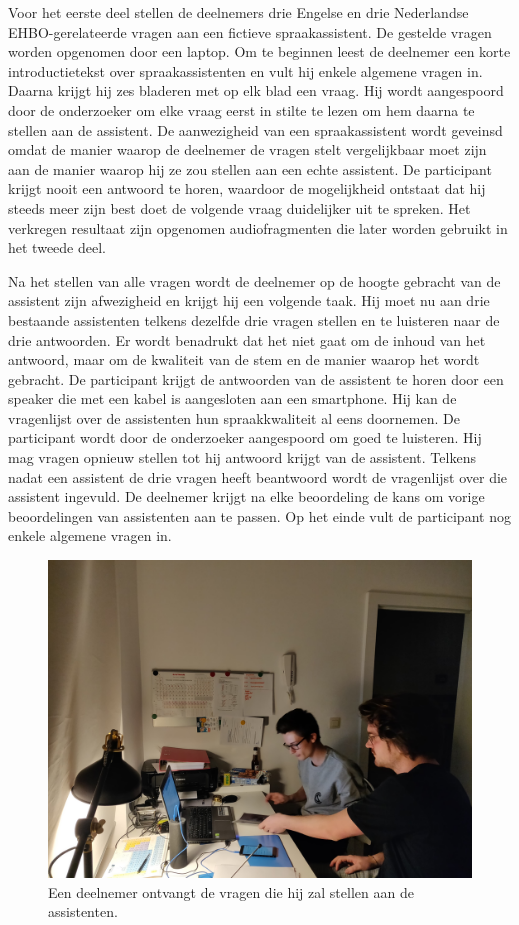 Voor het eerste deel stellen de deelnemers drie Engelse en drie Nederlandse EHBO-gerelateerde vragen aan een fictieve spraakassistent. De gestelde vragen worden opgenomen door een laptop.
Om te beginnen leest de deelnemer een korte introductietekst over spraakassistenten en vult hij enkele algemene vragen in. Daarna krijgt hij zes bladeren met op elk blad een vraag. Hij wordt aangespoord door de onderzoeker om elke vraag eerst in stilte te lezen om hem daarna te stellen aan de assistent. De aanwezigheid van een spraakassistent wordt geveinsd omdat de manier waarop de deelnemer de vragen stelt vergelijkbaar moet zijn aan de manier waarop hij ze zou stellen aan een echte assistent. De participant krijgt nooit een antwoord te horen, waardoor de mogelijkheid ontstaat dat hij steeds meer zijn best doet de volgende vraag duidelijker uit te spreken. Het verkregen resultaat zijn opgenomen audiofragmenten die later worden gebruikt in het tweede deel.

Na het stellen van alle vragen wordt de deelnemer op de hoogte gebracht van de assistent zijn afwezigheid en krijgt hij een volgende taak. Hij moet nu aan drie bestaande assistenten telkens dezelfde drie vragen stellen en te luisteren naar de drie antwoorden. Er wordt benadrukt dat het niet gaat om de inhoud van het antwoord, maar om de kwaliteit van de stem en de manier waarop het wordt gebracht. De participant krijgt de antwoorden van de assistent te horen door een speaker die met een kabel is aangesloten aan een smartphone. Hij kan de vragenlijst over de assistenten hun spraakkwaliteit al eens doornemen. De participant wordt door de onderzoeker aangespoord om goed te luisteren. Hij mag vragen opnieuw stellen tot hij antwoord krijgt van de assistent. Telkens nadat een assistent de drie vragen heeft beantwoord wordt de vragenlijst over die assistent ingevuld. De deelnemer krijgt na elke beoordeling de kans om vorige beoordelingen van assistenten aan te passen. Op het einde vult de participant nog enkele algemene vragen in.

\begin{figure}[h]
    \centering
    \includegraphics[width=0.7\linewidth]{img/proefafname2}
    \caption{Een deelnemer ontvangt de vragen die hij zal stellen aan de assistenten.}
    \label{fig:proefafname1}
\end{figure}

